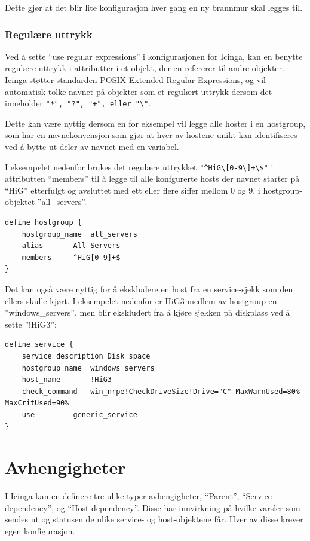 Dette gjør at det blir lite konfigurasjon hver gang en ny brannmur skal legges til.

\subsubsection{Regulære uttrykk}
Ved å sette ``use regular expressions'' i konfigurasjonen for Icinga, kan en benytte regulære uttrykk i attributter i et objekt, der en refererer til andre objekter. Icinga støtter standarden POSIX Extended Regular Expressions, og vil automatisk tolke navnet på objekter som et regulært uttrykk dersom det inneholder \verb|"*", "?", "+", eller "\"|.

Dette kan være nyttig dersom en for eksempel vil legge alle hoster i en hostgroup, som har en navnekonvensjon som gjør at hver av hostene unikt kan identifiseres ved å bytte ut deler av navnet med en variabel.

I eksempelet nedenfor brukes det regulære uttrykket \verb|"^HiG\[0-9\]+\$"| i attributten ``members'' til å legge til alle konfgurerte hosts der navnet starter på ``HiG'' etterfulgt og avsluttet med ett eller flere siffer mellom 0 og 9, i hostgroup-objektet ''all\_servers''.
\begin{lstlisting}[style=example]
define hostgroup {
    hostgroup_name	all_servers
    alias		All Servers
    members		^HiG[0-9]+$
}
\end{lstlisting}

Det kan også være nyttig for å ekskludere en host fra en service-sjekk som den ellers skulle kjørt. I eksempelet nedenfor er HiG3 medlem av hostgroup-en ''windows\_servers'', men blir ekskludert fra å kjøre sjekken på diskplass ved å sette ''!HiG3'':
\begin{lstlisting}[style=example]
define service {
    service_description	Disk space
    hostgroup_name	windows_servers
    host_name		!HiG3
    check_command	win_nrpe!CheckDriveSize!Drive="C" MaxWarnUsed=80% MaxCritUsed=90%
    use			generic_service
}
\end{lstlisting}

\section{Avhengigheter}
I Icinga kan en definere tre ulike typer avhengigheter, ``Parent'', ``Service dependency'', og ``Host dependency''. Disse har innvirkning på hvilke varsler som sendes ut og statusen de ulike service- og host-objektene får. Hver av disse krever egen konfigurasjon. 

